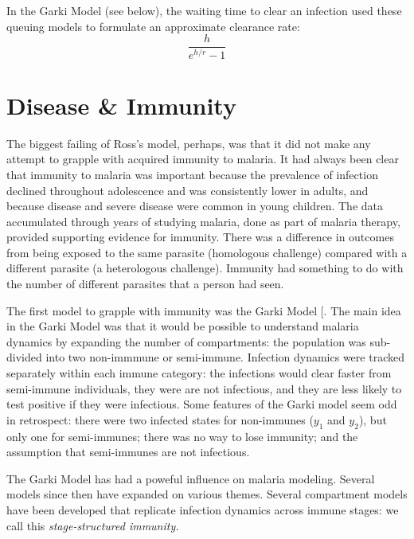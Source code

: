 \documentclass[
]{book}
\begin{document}
In the Garki Model (see below), the waiting time to clear an infection used these queuing models to formulate an approximate clearance rate: \[ \frac{h}{e^{h/r}-1}\]

\section{Disease \& Immunity}\label{disease-immunity}

The biggest failing of Ross's model, perhaps, was that it did not make any attempt to grapple with acquired immunity to malaria. It had always been clear that immunity to malaria was important because the prevalence of infection declined throughout adolescence and was consistently lower in adults, and because disease and severe disease were common in young children. The data accumulated through years of studying malaria, done as part of malaria therapy, provided supporting evidence for immunity. There was a difference in outcomes from being exposed to the same parasite (homologous challenge) compared with a different parasite (a heterologous challenge). Immunity had something to do with the number of different parasites that a person had seen.

The first model to grapple with immunity was the Garki Model {[}\citeproc{ref-DietzK1974GarkiModel}{65}{]}. The main idea in the Garki Model was that it would be possible to understand malaria dynamics by expanding the number of compartments: the population was sub-divided into two non-immmune or semi-immune. Infection dynamics were tracked separately within each immune category: the infections would clear faster from semi-immune individuals, they were are not infectious, and they are less likely to test positive if they were infectious. Some features of the Garki model seem odd in retrospect: there were two infected states for non-immunes (\(y_1\) and \(y_2\)), but only one for semi-immunes; there was no way to lose immunity; and the assumption that semi-immunes are not infectious.

The Garki Model has had a poweful influence on malaria modeling. Several models since then have expanded on various themes. Several compartment models have been developed that replicate infection dynamics across immune stages: we call this \emph{stage-structured immunity.}
\end{document}
